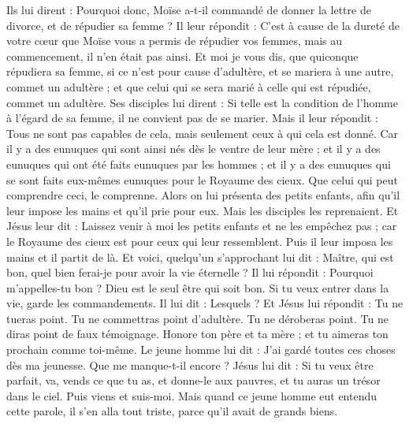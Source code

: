 \begin{multicols}{2}
Ils lui dirent : Pourquoi donc, Moïse a-t-il commandé de donner la lettre de divorce, et de répudier sa femme ?
Il leur répondit : C'est à cause de la dureté de votre cœur que Moïse vous a permis de répudier vos femmes, mais au commencement, il n'en était pas ainsi.
Et moi je vous dis, que quiconque répudiera sa femme, si ce n'est pour cause d'adultère, et se mariera à une autre, commet un adultère ; et que celui qui se sera marié à celle qui est répudiée, commet un adultère.
Ses disciples lui dirent : Si telle est la condition de l'homme à l'égard de sa femme, il ne convient pas de se marier.
Mais il leur répondit : Tous ne sont pas capables de cela, mais seulement ceux à qui cela est donné.
Car il y a des eunuques qui sont ainsi nés dès le ventre de leur mère ; et il y a des eunuques qui ont été faits eunuques par les hommes ; et il y a des eunuques qui se sont faits eux-mêmes eunuques pour le Royaume des cieux. Que celui qui peut comprendre ceci, le comprenne.
Alors on lui présenta des petits enfants, afin qu'il leur impose les mains et qu'il prie pour eux. Mais les disciples les reprenaient.
Et Jésus leur dit : Laissez venir à moi les petits enfants et ne les empêchez pas ; car le Royaume des cieux est pour ceux qui leur ressemblent.
Puis il leur imposa les mains et il partit de là.
Et voici, quelqu'un s'approchant lui dit : Maître, qui est bon, quel bien ferai-je pour avoir la vie éternelle ?
Il lui répondit : Pourquoi m'appelles-tu bon ? Dieu est le seul être qui soit bon. Si tu veux entrer dans la vie, garde les commandements.
Il lui dit : Lesquels ? Et Jésus lui répondit : Tu ne tueras point. Tu ne commettras point d'adultère. Tu ne déroberas point. Tu ne diras point de faux témoignage.
Honore ton père et ta mère ; et tu aimeras ton prochain comme toi-même.
Le jeune homme lui dit : J'ai gardé toutes ces choses dès ma jeunesse. Que me manque-t-il encore ?
Jésus lui dit : Si tu veux être parfait, va, vends ce que tu as, et donne-le aux pauvres, et tu auras un trésor dans le ciel. Puis viens et suis-moi.
Mais quand ce jeune homme eut entendu cette parole, il s'en alla tout triste, parce qu'il avait de grands biens.

\end{multicols}
